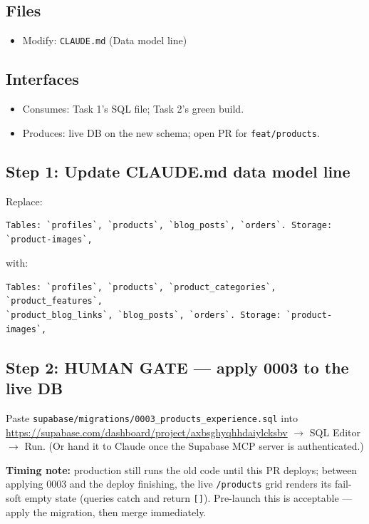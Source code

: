 \documentclass[11pt,a4paper]{article}
\begin{document}
\subsection*{Files}
\begin{itemize}
  \item Modify: \texttt{CLAUDE.md} (Data model line)
\end{itemize}

\subsection*{Interfaces}
\begin{itemize}
  \item Consumes: Task 1's SQL file; Task 2's green build.
  \item Produces: live DB on the new schema; open PR for \texttt{feat/products}.
\end{itemize}

\subsection*{Step 1: Update CLAUDE.md data model line}

Replace:

\begin{lstlisting}
Tables: `profiles`, `products`, `blog_posts`, `orders`. Storage: `product-images`,
\end{lstlisting}

with:

\begin{lstlisting}
Tables: `profiles`, `products`, `product_categories`, `product_features`,
`product_blog_links`, `blog_posts`, `orders`. Storage: `product-images`,
\end{lstlisting}

\subsection*{Step 2: HUMAN GATE --- apply 0003 to the live DB}

Paste \texttt{supabase/migrations/0003\_products\_experience.sql} into
\url{https://supabase.com/dashboard/project/axbsghyqhhdaiylcksbv} $\rightarrow$ SQL Editor
$\rightarrow$ Run. (Or hand it to Claude once the Supabase MCP server is authenticated.)

\textbf{Timing note:} production still runs the old code until this PR deploys; between
applying 0003 and the deploy finishing, the live \texttt{/products} grid renders its fail-soft
empty state (queries catch and return \texttt{[]}). Pre-launch this is acceptable --- apply the
migration, then merge immediately.
\end{document}
